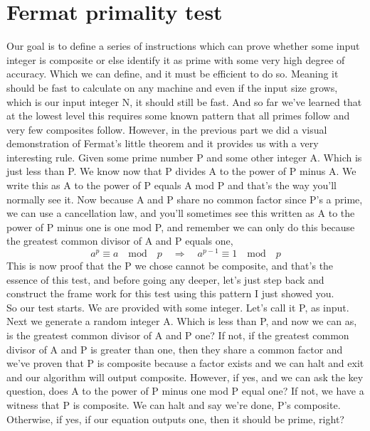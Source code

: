 \documentclass{report}
\begin{document}
\section{Fermat primality test}
Our goal is to define a series of instructions which can prove whether some input integer is composite or else identify it as prime with some very high degree of accuracy. Which we can define, and it must be efficient to do so. Meaning it should be fast to calculate on any machine and even if the input size grows, which is our input integer N, it should still be fast. And so far we've learned that at the lowest level this requires some known pattern that all primes follow and very few composites follow. However, in the previous part we did a visual demonstration of Fermat's little theorem and it provides us with a very interesting rule. Given some prime number P and some other integer A. Which is just less than P. We know now that P divides A to the power of P minus A. We write this as A to the power of P equals A mod P and that's the way you'll normally see it. Now because A and P share no common factor since P's a prime, we can use a cancellation law, and you'll sometimes see this written as A to the power of P minus one is one mod P, and remember we can only do this because the greatest common divisor of A and P equals one,
$$a^p \equiv a \quad \text{mod} \quad p \quad \Rightarrow \quad a^{p-1} \equiv 1 \quad \text{mod} \quad p$$
 This is now proof that the P we chose cannot be composite, and that's the essence of this test, and before going any deeper, let's just step back and construct the frame work for this test using this pattern I just showed you. \\
So our test starts. We are provided with some integer. Let's call it P, as input. Next we generate a random integer A. Which is less than P, and now we can as, is the greatest common divisor of A and P one? If not, if the greatest common divisor of A and P is greater than one, then they share a common factor and we've proven that P is composite because a factor exists and we can halt and exit and our algorithm will output composite. However, if yes, and we can ask the key question, does A to the power of P minus one mod P equal one? If not, we have a witness that P is composite. We can halt and say we're done, P's composite. Otherwise, if yes, if our equation outputs one, then it should be prime, right?
\end{document}

